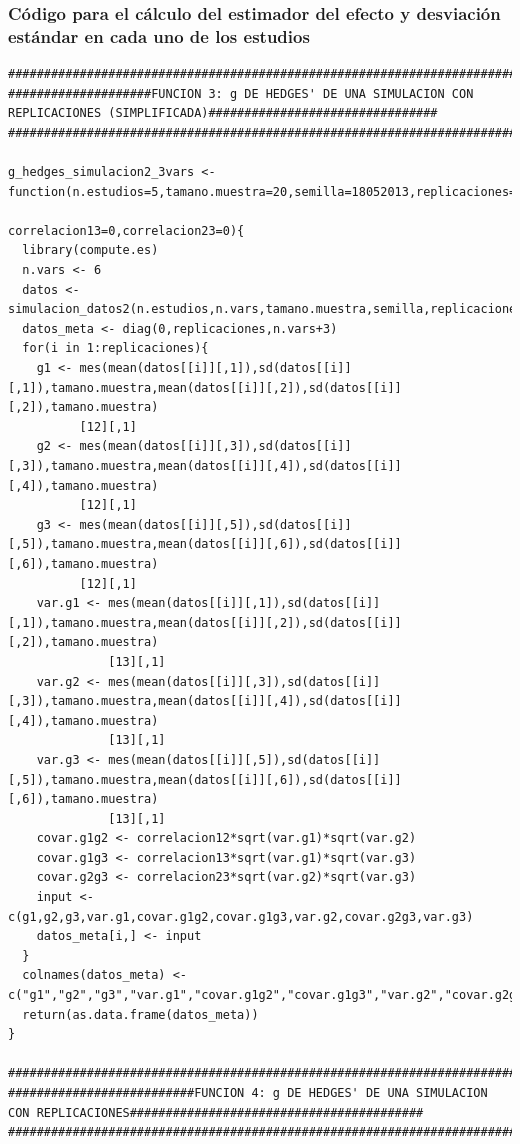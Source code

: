 \documentclass[a4paper,openright,12pt]{report}
\begin{document}
\subsubsection{Código para el cálculo del estimador del efecto y desviación estándar en cada uno de los estudios}
{\tiny
\begin{verbatim}
##############################################################################################################################
####################FUNCION 3: g DE HEDGES' DE UNA SIMULACION CON REPLICACIONES (SIMPLIFICADA)################################
##############################################################################################################################

g_hedges_simulacion2_3vars <- function(n.estudios=5,tamano.muestra=20,semilla=18052013,replicaciones=5,correlacion12=0,
                                       correlacion13=0,correlacion23=0){
  library(compute.es)
  n.vars <- 6
  datos <- simulacion_datos2(n.estudios,n.vars,tamano.muestra,semilla,replicaciones) 
  datos_meta <- diag(0,replicaciones,n.vars+3)
  for(i in 1:replicaciones){
    g1 <- mes(mean(datos[[i]][,1]),sd(datos[[i]][,1]),tamano.muestra,mean(datos[[i]][,2]),sd(datos[[i]][,2]),tamano.muestra)
          [12][,1]
    g2 <- mes(mean(datos[[i]][,3]),sd(datos[[i]][,3]),tamano.muestra,mean(datos[[i]][,4]),sd(datos[[i]][,4]),tamano.muestra) 
          [12][,1]
    g3 <- mes(mean(datos[[i]][,5]),sd(datos[[i]][,5]),tamano.muestra,mean(datos[[i]][,6]),sd(datos[[i]][,6]),tamano.muestra)
          [12][,1]
    var.g1 <- mes(mean(datos[[i]][,1]),sd(datos[[i]][,1]),tamano.muestra,mean(datos[[i]][,2]),sd(datos[[i]][,2]),tamano.muestra)
              [13][,1]
    var.g2 <- mes(mean(datos[[i]][,3]),sd(datos[[i]][,3]),tamano.muestra,mean(datos[[i]][,4]),sd(datos[[i]][,4]),tamano.muestra)
              [13][,1]
    var.g3 <- mes(mean(datos[[i]][,5]),sd(datos[[i]][,5]),tamano.muestra,mean(datos[[i]][,6]),sd(datos[[i]][,6]),tamano.muestra)
              [13][,1]
    covar.g1g2 <- correlacion12*sqrt(var.g1)*sqrt(var.g2)
    covar.g1g3 <- correlacion13*sqrt(var.g1)*sqrt(var.g3)
    covar.g2g3 <- correlacion23*sqrt(var.g2)*sqrt(var.g3)
    input <- c(g1,g2,g3,var.g1,covar.g1g2,covar.g1g3,var.g2,covar.g2g3,var.g3)
    datos_meta[i,] <- input
  }
  colnames(datos_meta) <- c("g1","g2","g3","var.g1","covar.g1g2","covar.g1g3","var.g2","covar.g2g3","var.g3")
  return(as.data.frame(datos_meta))
}

##############################################################################################################################
##########################FUNCION 4: g DE HEDGES' DE UNA SIMULACION CON REPLICACIONES#########################################
##############################################################################################################################


\end{verbatim}}
\end{document}
